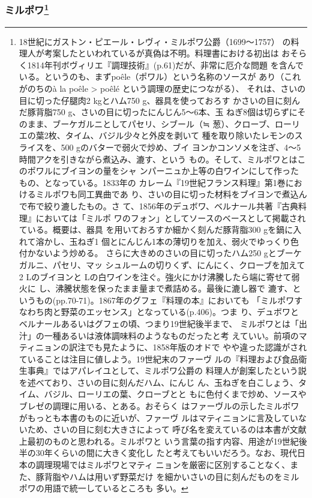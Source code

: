 \begin{recette}
\hypertarget{mirepoix}{%
\subsubsection[ミルポワ]{\texorpdfstring{ミルポワ\footnote{18世紀にガストン・ピエール・レヴィ・ミルポワ公爵（1699〜1757）
  の料理人が考案したといわれているが真偽は不明。料理書における初出は
  おそらく1814年刊ボヴィリエ『調理技術』(p.61)だが、非常に厄介な問題
  を含んでいる。というのも、まずpoêle（ポワル）という名称のソースが
  あり（これがのちのà la poêle \textgreater{} poêlé
  という調理の歴史につながる）、 それは、さいの目に切った仔腿肉2
  kgとハム750 g、器具を使っておろす かさいの目に刻んだ豚背脂750
  g、さいの目に切ったにんじん5〜6本、玉
  ねぎ8個は切らずにそのまま、ブーケガルニとしてパセリ、シブール（≒
  葱）、クローブ、ローリエの葉2枚、タイム、バジル少々と外皮を剥いて
  種を取り除いたレモンのスライスを、500 gのバターで弱火で炒め、ブイ
  ヨンかコンソメを注ぎ、4〜5時間アクを引きながら煮込み、漉す、という
  もの。そして、ミルポワとはこのポワルにブイヨンの\unquart{}量をシャ
  ンパーニュか上等の白ワインにして作ったもの、となっている。1833年の
  カレーム『19世紀フランス料理』第1巻におけるミルポワも同工異曲であ
  り、さいの目に切った材料をブイヨンで煮込んで布で絞り漉したもの。さ
  て、1856年のデュボワ、ベルナール共著『古典料理』においては「ミルポ
  ワのフォン」としてソースのベースとして掲載されている。概要は、器具
  を用いておろすか細かく刻んだ豚背脂300 gを鍋に入れて溶かし、玉ねぎ1
  個とにんじん1本の薄切りを加え、弱火でゆっくり色付かないよう炒める。
  さらに大きめのさいの目に切ったハム250 gとブーケガルニ、パセリ、マッ
  シュルームの切りくず、にんにく、クローブを加えて2 Lのブイヨンと
  \undemi{} Lの白ワインを注ぐ。強火にかけ沸騰したら端に寄せて弱火に
  し、沸騰状態を保ったまま\deuxtiers{}量まで煮詰める。最後に漉し器で
  漉す、というもの(pp.70-71)。1867年のグフェ『料理の本』においても
  「ミルポワすなわち肉と野菜のエッセンス」となっている(p.406)。つま
  り、デュボワとベルナールあるいはグフェの頃、つまり19世紀後半まで、
  ミルポワとは「出汁」の一種あるいは液体調味料のようなものだったと考
  えていい。前項のマティニョンの訳注でも見たように、1858年版のオドで
  やや違った認識がされていることは注目に値しよう。19世紀末のファーヴ
  ルの『料理および食品衛生事典』ではアパレイユとして、ミルポワ公爵の
  料理人が創案したという説を述べており、さいの目に刻んだハム、にんじ
  ん、玉ねぎを白こしょう、タイム、バジル、ローリエの葉、クローブとと
  もに色付くまで炒め、ソースやブレゼの調理に用いる、とある。おそらく
  はファーヴルの示したミルポワがもっとも本書のものに近いが、ファーヴ
  ルはマティニョンに言及していないため、さいの目に刻む大きさによって
  呼び名を変えているのは本書が文献上最初のものと思われる。ミルポワと
  いう言葉の指す内容、用途が19世紀後半の30年くらいの間に大きく変化し
  たと考えてもいいだろう。なお、現代日本の調理現場ではミルポワとマティ
  ニョンを厳密に区別することなく、また、豚背脂やハムは用いず野菜だけ
  を細かいさいの目に刻んだものをミルポワの用語で統一しているところも
  多い。}}{ミルポワ}}\label{mirepoix}}


\end{recette}
